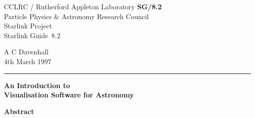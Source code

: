 \documentclass[twoside,11pt]{article}
\newcommand{\stardoccategory}  {Starlink Guide}
\newcommand{\stardocinitials}  {SG}
\newcommand{\stardocnumber}    {8.2}
\newcommand{\stardocauthors}   {A C Davenhall}
\newcommand{\stardocdate}      {4th March 1997}
\newcommand{\stardoctitle}     {An Introduction to \\ Visualisation
Software for Astronomy}
\newcommand{\stardocname}{\stardocinitials /\stardocnumber}
\newenvironment{latexonly}{}{}
\begin{document}
\thispagestyle{empty}

\begin{latexonly}
   CCLRC / {\sc Rutherford Appleton Laboratory} \hfill {\bf \stardocname}\\
   {\large Particle Physics \& Astronomy Research Council}\\
   {\large Starlink Project\\}
   {\large \stardoccategory\ \stardocnumber}
   \begin{flushright}
   \stardocauthors\\
   \stardocdate
   \end{flushright}
   \vspace{-4mm}
   \rule{\textwidth}{0.5mm}
   \vspace{5mm}
   \begin{center}
   {\Huge\bf  \stardoctitle \\ [2.5ex]}
   \end{center}
   \vspace{5mm}


   \vspace{10mm}
   \begin{center}
      {\Large\bf Abstract}
   \end{center}
\end{latexonly}
\end{document}
